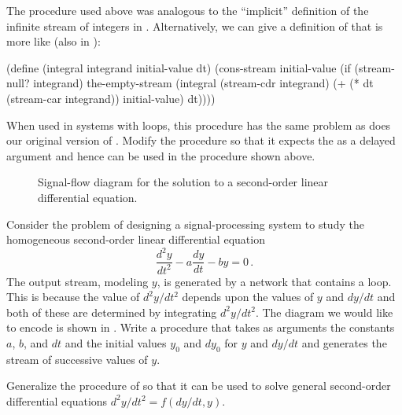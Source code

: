\begin{exercise}
	\label{Exercise 3.77}
	The  procedure used above was analogous to the “implicit” definition of the infinite stream of integers in .
	Alternatively, we can give a definition of  that is more like  (also in ):
	\begin{smallscheme}
	  (define (integral integrand initial-value dt)
	    (cons-stream
	     initial-value
	     (if (stream-null? integrand)
	         the-empty-stream
	         (integral (stream-cdr integrand)
	                   (+ (* dt (stream-car integrand))
	                      initial-value)
	                   dt))))
	\end{smallscheme}
	When used in systems with loops, this procedure has the same problem as does our original version of .
	Modify the procedure so that it expects the  as a delayed argument and hence can be used in the  procedure shown above.
\end{exercise}



\begin{figure}[tb]
	\centering
	
	\caption{
		Signal-flow diagram for the solution to a second-order linear differential equation.
	}
	\label{Figure 3.35}
\end{figure}



\begin{exercise}
	\label{Exercise 3.78}
	Consider the problem of designing a signal-processing system to study the homogeneous second-order linear differential equation
	\[
		\frac{d^2 y}{d t^2} - a \frac{d y}{d t} - b y = 0 \,.
	\]
	The output stream, modeling \( y \), is generated by a network that contains a loop.
	This is because the value of \( d^2 y / d t^2 \) depends upon the values of \( y \) and \( dy / dt \) and both of these are determined by integrating \( d^2 y / dt^2 \).
	The diagram we would like to encode is shown in .
	Write a procedure  that takes as arguments the constants \( a \), \( b \), and \( dt \) and the initial values \( y_0 \) and \( dy_0 \) for \( y \) and \( dy / dt \) and generates the stream of successive values of \( y \).
\end{exercise}



\begin{exercise}
	\label{Exercise 3.79}
	Generalize the  procedure of  so that it can be used to solve general second-order differential equations \( d^2 y / d t^2 = f(dy / dt, y) \).
\end{exercise}



